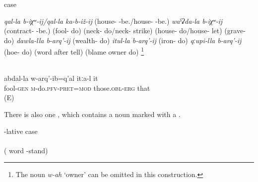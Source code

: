 %
\begin{exe}
	\ex	{} case	\label{ex:markednouncpgenitive}
	\begin{xlist}
		\ex \label{ex:markednouncpgenitiveget married} \textit{qal-la b-iχʷ-ij\slash qal-la ka-b-iž-ij} (house- -be.\slash house- -be.)  
		\ex \textit{waˁʡda-la b-iχʷ-ij} (contract- -be.) 
	\ex	{} (fool- do)  
	\ex	{} (neck- do\slash neck- strike) 
	\ex	{} (house- do\slash house- let) 
	\ex	{} (grave- do) 
	\ex \textit{dawla-lla b-arq'-ij} (wealth- do) 
	\ex \textit{itul-la b-arq'-ij} (iron- do)  \label{ex:IRON}
	\ex \textit{qːupi-lla b-arq'-ij} (hoe- do) 	\label{ex:WEED}
	\ex	{}  (word after tell) \label{exGossip}
	\ex	{} (blame owner do)  \footnote{The noun \textit{w-ah} `owner' can be omitted in this construction.} \label{ex:considerguilty} 
	\end{xlist}
\end{exe}

\begin{exe}
		\ex	{}  \label{ex:They took him for a foolCOMPOUND}\\
		\gll	abdal-la	w-arq'-ib=q'al	itːa-l	it\\
			fool-\textsc{gen}	\textsc{m}-do.\textsc{pfv}-\textsc{pret}=\textsc{mod}	those.\textsc{obl}-\textsc{erg}	that\\
		\glt	{} (E)
\end{exe}

There is also one , which contains a noun marked with a  .

\begin{exe}
			\ex	{}-lative case	\label{ex:markednouncplocative} \\   \\
			( word -stand) 
\end{exe}


